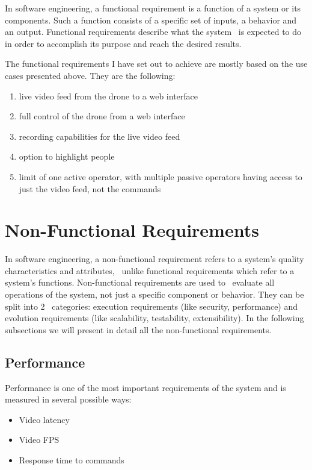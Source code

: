 In software engineering, a functional requirement is a function of a system or its components.
Such a function consists of a specific set of inputs, a behavior and an output.
Functional requirements describe what the system \
is expected to do in order to accomplish its purpose and reach the desired results.

The functional requirements I have set out to achieve are mostly based on the use cases presented above.
They are the following:
\begin{enumerate}
    \item live video feed from the drone to a web interface
    \item full control of the drone from a web interface
    \item recording capabilities for the live video feed
    \item option to highlight people
    \item limit of one active operator, with multiple passive operators having access to just the video feed, not the commands
\end{enumerate}

\section{Non-Functional Requirements}
\label{sec:non-functional-requirements}

In software engineering, a non-functional requirement refers to a system's quality characteristics and attributes, \
unlike functional requirements which refer to a system's functions.
Non-functional requirements are used to \
evaluate all operations of the system, not just a specific component or behavior.
They can be split into 2 \
categories: execution requirements (like security, performance) and evolution requirements (like scalability,
testability, extensibility).
In the following subsections we will present in detail all the non-functional requirements.

\subsection{Performance}
\label{subsec:specification-performance}
Performance is one of the most important requirements of the system and is measured in several possible ways:
\begin{itemize}
    \item Video latency
    \item Video FPS
    \item Response time to commands
\end{itemize}

